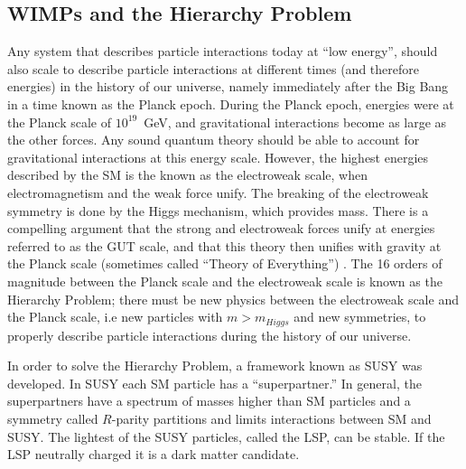 \subsection{WIMPs and the Hierarchy Problem}
Any system that describes particle interactions today at ``low energy'', should also scale to describe particle interactions at different times (and therefore energies) in the history of our universe, namely immediately after the Big Bang in a time known as the Planck epoch. During the Planck epoch, energies were at the Planck scale of $10^{19}$~GeV, and gravitational interactions become as large as the other forces. Any sound quantum theory should be able to account for gravitational interactions at this energy scale. However, the highest energies described by the \ac{SM} is the known as the electroweak scale, when electromagnetism and the weak force unify. The breaking of the electroweak symmetry is done by the Higgs mechanism, which provides mass. There is a compelling argument that the strong and electroweak forces unify at energies referred to as the \ac{GUT} scale, and that this theory then unifies with gravity at the Planck scale (sometimes called ``Theory of Everything'') \cite{Dimopoulos1991}. The 16 orders of magnitude between the Planck scale and the electroweak scale is known as the Hierarchy Problem; there must be new physics between the electroweak scale and the Planck scale, i.e new particles with $m > m_{Higgs}$ and new symmetries, to properly describe particle interactions during the history of our universe.

In order to solve the Hierarchy Problem, a framework known as \ac{SUSY} was developed. In \ac{SUSY} each \ac{SM} particle has a ``superpartner.'' In general, the superpartners have a spectrum of masses higher than \ac{SM} particles and a symmetry called $R$-parity partitions and limits interactions between \ac{SM} and \ac{SUSY}. The lightest of the \ac{SUSY} particles, called the \ac{LSP}, can be stable. If the \ac{LSP} neutrally charged it is a dark matter candidate.

